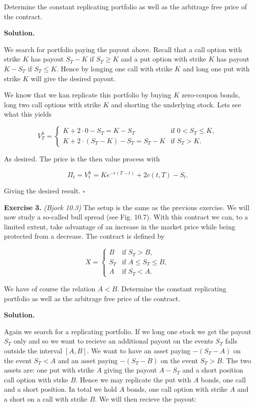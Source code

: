 \documentclass[a4paper,12pt,openany]{book}
\begin{document}
Determine the constant replicating portfolio as well as the arbitrage free price of the contract.

\textbf{Solution.}

We search for portfolio paying the payout above. Recall that a call option with strike \(K\) has payout \(S_T-K\) if \(S_T\ge K\) and a put option with strike \(K\) has payout \(K-S_T\) if \(S_T\le K\). Hence by longing one call with strike \(K\) and long one put with strike \(K\) will give the desired payout.

We know that we kan replicate this portfolio by buying \(K\) zero-coupon bonds, long two call options with strike \(K\) and shorting the underlying stock. Lets see what this yields

\[
V_T^h =
\begin{cases}
  K+2\cdot 0-S_T=K-S_T & \text{if }0<S_T\le K,\\
  K+2\cdot(S_T-K)-S_T=S_T-K & \text{if }S_T>K.
\end{cases}
\]

As desired. The price is the then value process with

\[
\Pi_t=V_t^h=Ke^{-r(T-t)}+2c(t,T)-S_t.
\]

Giving the desired result. \(\square\)

\textbf{Exercise 3.} \emph{(Bjork 10.3)} The setup is the same as the previous exercise. We will now study a so-called bull spread (see Fig. 10.7). With this contract we can, to a limited extent, take advantage of an increase in the market price while being protected from a decrease. The contract is defined by

\[
X=
\begin{cases}
  B & \text{if }S_T>B,\\
  S_T & \text{if }A\le S_T\le B,\\
  A &\text{if }S_T< A.
\end{cases}
\]

We have of course the relation \(A<B\). Determine the constant replicating portfolio as well as the arbitrage free price of the contract.

\textbf{Solution.}

Again we search for a replicating portfolio. If we long one stock we get the payout \(S_T\) only and so we want to recieve an additional payout on the events \(S_T\) falls outside the interval \([A,B]\). We want to have an asset paying \(-(S_T-A)\) on the event \(S_T<A\) and an asset paying \(-(S_T-B)\) on the event \(S_T>B\). The two assets are: one put with strike \(A\) giving the payout \(A-S_T\) and a short position call option with strke \(B\). Hence we may replicate the put with \(A\) bonds, one call and a short position. In total we hold \(A\) bonds, one call option with strike \(A\) and a short on a call with strike \(B\). We will then recieve the payout:
\end{document}
